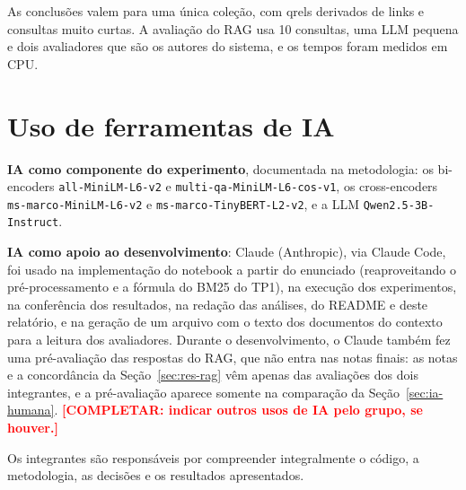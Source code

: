 \documentclass[11pt,a4paper]{article}
\newcommand{\cod}[1]{\texttt{#1}}
\newcommand{\completar}[1]{\textcolor{red}{\textbf{[COMPLETAR: #1]}}}
\begin{document}
As conclusões valem para uma única coleção, com qrels derivados de links e consultas muito curtas. A avaliação do RAG usa 10 consultas, uma LLM pequena e dois avaliadores que são os autores do sistema, e os tempos foram medidos em CPU.

\section{Uso de ferramentas de IA}

\textbf{IA como componente do experimento}, documentada na metodologia: os bi-encoders \cod{all-MiniLM-L6-v2} e \cod{multi-qa-MiniLM-L6-cos-v1}, os cross-encoders \cod{ms-marco-MiniLM-L6-v2} e \cod{ms-marco-TinyBERT-L2-v2}, e a LLM \cod{Qwen2.5-3B-Instruct}.

\textbf{IA como apoio ao desenvolvimento}: Claude (Anthropic), via Claude Code, foi usado na implementação do notebook a partir do enunciado (reaproveitando o pré-processamento e a fórmula do BM25 do TP1), na execução dos experimentos, na conferência dos resultados, na redação das análises, do README e deste relatório, e na geração de um arquivo com o texto dos documentos do contexto para a leitura dos avaliadores. Durante o desenvolvimento, o Claude também fez uma pré-avaliação das respostas do RAG, que não entra nas notas finais: as notas e a concordância da Seção~\ref{sec:res-rag} vêm apenas das avaliações dos dois integrantes, e a pré-avaliação aparece somente na comparação da Seção~\ref{sec:ia-humana}. \completar{indicar outros usos de IA pelo grupo, se houver.}

Os integrantes são responsáveis por compreender integralmente o código, a metodologia, as decisões e os resultados apresentados.
\end{document}
